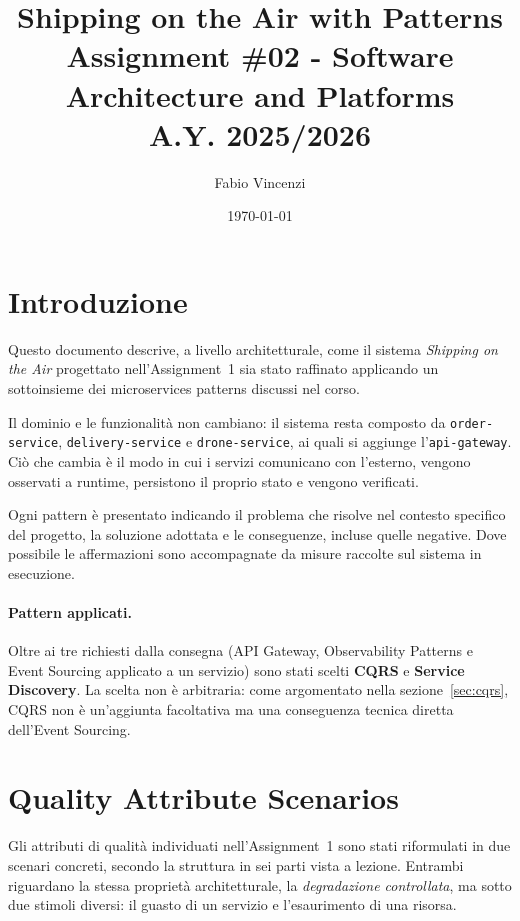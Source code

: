 \documentclass[12pt,a4paper]{article}
\title{
    \textbf{Shipping on the Air with Patterns} \\[0.5em]
    \large Assignment \#02 - Software Architecture and Platforms \\[0.3em]
    \normalsize A.Y. 2025/2026
}
\author{Fabio Vincenzi}
\date{\today}
\begin{document}
\maketitle
\tableofcontents
\newpage

\section{Introduzione}

Questo documento descrive, a livello architetturale, come il sistema \emph{Shipping on the Air}
progettato nell'Assignment~1 sia stato raffinato applicando un sottoinsieme dei microservices
patterns discussi nel corso.

Il dominio e le funzionalit\`a non cambiano: il sistema resta composto da \texttt{order-service},
\texttt{delivery-service} e \texttt{drone-service}, ai quali si aggiunge l'\texttt{api-gateway}.
Ci\`o che cambia \`e il modo in cui i servizi comunicano con l'esterno, vengono osservati a runtime,
persistono il proprio stato e vengono verificati.

Ogni pattern \`e presentato indicando il problema che risolve nel contesto specifico del progetto,
la soluzione adottata e le conseguenze, incluse quelle negative. Dove possibile le affermazioni
sono accompagnate da misure raccolte sul sistema in esecuzione.

\paragraph{Pattern applicati.} Oltre ai tre richiesti dalla consegna (API Gateway,
Observability Patterns e Event Sourcing applicato a un servizio) sono stati scelti \textbf{CQRS} e \textbf{Service Discovery}. La scelta non \`e
arbitraria: come argomentato nella sezione~\ref{sec:cqrs}, CQRS non \`e un'aggiunta facoltativa ma
una conseguenza tecnica diretta dell'Event Sourcing.

\section{Quality Attribute Scenarios}
\label{sec:qas}

Gli attributi di qualit\`a individuati nell'Assignment~1 sono stati riformulati in due scenari
concreti, secondo la struttura in sei parti vista a lezione. Entrambi riguardano la stessa
propriet\`a architetturale, la \emph{degradazione controllata}, ma sotto due stimoli diversi:
il guasto di un servizio e l'esaurimento di una risorsa.
\end{document}
